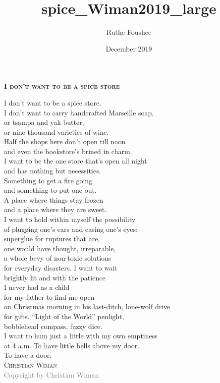 \documentclass[14pt]{memoir}
\title{spice_Wiman2019_large}
\author{Ruthe Foushee}
\date{December 2019}
\begin{document}
\thispagestyle{empty}
\textbf{\textsc{\large I don't want to be a spice store}}
\vspace{32pt}

I don't want to be a spice store.\\
I don't want to carry handcrafted Marseille soap,\\
or tsampa and yak butter,\\
or nine thousand varieties of wine.\\
Half the shops here don't open till noon\\
and even the bookstore's brined in charm.\\
I want to be the one store that's open all night\\
and has nothing but necessities.\\
Something to get a fire going\\
and something to put one out.\\
A place where things stay frozen\\
and a place where they are sweet.\\
I want to hold within myself the possibility\\
of plugging one's ears and easing one's eyes;\\
superglue for ruptures that are,\\
one would have thought, irreparable,\\
a whole bevy of non-toxic solutions\\
for everyday disasters. I want to wait\\
brightly lit and with the patience\\
I never had as a child\\
for my father to find me open\\
on Christmas morning in his last-ditch, lone-wolf drive\\
for gifts. ``Light of the World'' penlight,\\
bobblehead compass, fuzzy dice.\\
I want to hum just a little with my own emptiness\\
at 4 a.m. To have little bells above my door.\\
To have a door.\\

\vspace{12pt}
\hspace{90pt} \textsc{Christian Wiman}\\
\vfill
\noindent\footnotesize{
\textcolor{gray}{Copyright  by Christian Wiman.}} 
\end{document}
